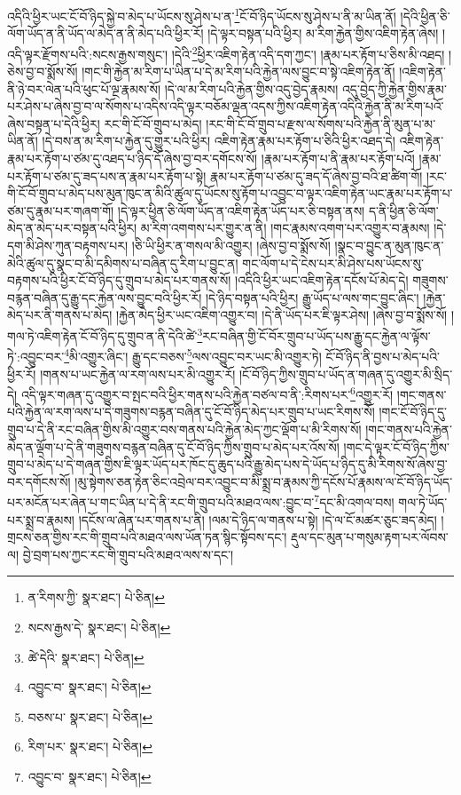འདིའི་ཕྱིར་ཡང་ངོ་བོ་ཉིད་སྐྱེ་བ་མེད་པ་ཡོངས་སུ་ཤེས་པ་ན་\footnote{ན་རིགས་ཀྱི་  སྣར་ཐང་།  པེ་ཅིན། }ངོ་བོ་ཉིད་ཡོངས་སུ་ཤེས་པ་ནི་མ་ཡིན་ནོ། །དེའི་ཕྱིན་ཅི་ལོག་ཡོད་ན་ནི་ཡོད་ལ་མེད་ན་ནི་མེད་པའི་ཕྱིར་རོ། །དེ་ལྟར་བསྟན་པའི་ཕྱིར། མ་རིག་རྐྱེན་གྱིས་འཇིག་རྟེན་ཞེས། །འདི་ལྟར་རྫོགས་པའི་:སངས་རྒྱས་གསུང་། །དེའི་\footnote{སངས་རྒྱས་དེ་  སྣར་ཐང་།  པེ་ཅིན། }ཕྱིར་འཇིག་རྟེན་འདི་དག་ཀྱང་། །རྣམ་པར་རྟོག་པ་ཅིས་མི་འཐད། །ཅེས་བྱ་བ་སྨོས་སོ། །གང་གི་རྐྱེན་མ་རིག་པ་ཡིན་པ་དེ་མ་རིག་པའི་རྐྱེན་ལས་བྱུང་བ་སྟེ་འཇིག་རྟེན་ནོ། །འཇིག་རྟེན་ནི་ཉེ་བར་ལེན་པའི་ཕུང་པོ་ལྔ་རྣམས་སོ། །དེ་ལ་མ་རིག་པའི་རྐྱེན་གྱིས་འདུ་བྱེད་རྣམས། འདུ་བྱེད་ཀྱི་རྐྱེན་གྱིས་རྣམ་པར་ཤེས་པ་ཞེས་བྱ་བ་ལ་སོགས་པ་འདིས་འདི་ལྟར་བཅོམ་ལྡན་འདས་ཀྱིས་འཇིག་རྟེན་འདིའི་རྐྱེན་ནི་མ་རིག་པའོ་ཞེས་བསྟན་པ་དེའི་ཕྱིར། རང་གི་ངོ་བོ་གྲུབ་པ་མེད། །རང་གི་ངོ་བོ་གྲུབ་པ་རྫས་ལ་སོགས་པའི་རྐྱེན་ནི་མུན་པ་མ་ཡིན་ནོ། །དེ་བས་ན་མ་རིག་པ་རྐྱེན་དུ་གྱུར་པའི་ཕྱིར། འཇིག་རྟེན་རྣམ་པར་རྟོག་པ་ཅིའི་ཕྱིར་འཐད་དེ། འཇིག་རྟེན་རྣམ་པར་རྟོག་པ་ཙམ་དུ་འཐད་པ་ཉིད་དོ་ཞེས་བྱ་བར་དགོངས་སོ། །རྣམ་པར་རྟོག་པ་ནི་རྣམ་པར་རྟོག་པའོ། །རྣམ་པར་རྟོག་པ་ཙམ་དུ་ཟད་པས་ན་རྣམ་པར་རྟོག་པ་སྟེ། རྣམ་པར་རྟོག་པ་ཙམ་དུ་ཟད་དོ་ཞེས་བྱ་བའི་ཐ་ཚིག་གོ། །རང་གི་ངོ་བོ་གྲུབ་པ་མེད་པས་མུན་ཁུང་ན་མིའི་ཚུལ་དུ་ཡོངས་སུ་རྟོག་པ་འབྱུང་བ་ལྟར་འཇིག་རྟེན་ཡང་རྣམ་པར་རྟོག་པ་ཙམ་དུ་རྣམ་པར་གཞག་གོ། །དེ་ལྟར་ཕྱིན་ཅི་ལོག་ཡོད་ན་འཇིག་རྟེན་ཡོད་པར་ཅི་བསྟན་ནས། ད་ནི་ཕྱིན་ཅི་ལོག་མེད་ན་མེད་པར་བསྟན་པའི་ཕྱིར། མ་རིག་འགགས་པར་གྱུར་ན་ནི། །གང་རྣམས་འགག་པར་འགྱུར་བ་རྣམས། །དེ་དག་མི་ཤེས་ཀུན་བརྟགས་པར། །ཅི་ཡི་ཕྱིར་ན་གསལ་མི་འགྱུར། །ཞེས་བྱ་བ་སྨོས་སོ། །སྣང་བ་བྱུང་ན་མུན་ཁུང་ན་མེའི་ཚུལ་དུ་སྣང་བ་མི་དམིགས་པ་བཞིན་དུ་རིག་པ་བྱུང་ན། གང་ལོག་པ་དེ་ངེས་པར་མི་ཤེས་པས་ཡོངས་སུ་བརྟགས་པའི་ཕྱིར་ངོ་བོ་ཉིད་དུ་གྲུབ་པ་མེད་པར་གནས་སོ། །འདིའི་ཕྱིར་ཡང་འཇིག་རྟེན་དངོས་པོ་མེད་དེ། གཟུགས་བརྙན་བཞིན་དུ་རྒྱུ་དང་རྐྱེན་ལས་བྱུང་བའི་ཕྱིར་རོ། །དེ་ཉིད་བསྟན་པའི་ཕྱིར། རྒྱུ་ཡོད་པ་ལས་གང་བྱུང་ཞིང་། །རྐྱེན་མེད་པར་ནི་གནས་པ་མེད། །རྐྱེན་མེད་ཕྱིར་ཡང་འཇིག་འགྱུར་བ། །དེ་ནི་ཡོད་པར་ཇི་ལྟར་ཤེས། །ཞེས་བྱ་བ་སྨོས་སོ། །གལ་ཏེ་འཇིག་རྟེན་ངོ་བོ་ཉིད་དུ་གྲུབ་ན་ནི་དེའི་ཚེ་\footnote{ཚེ་དེའི་  སྣར་ཐང་།  པེ་ཅིན། }རང་བཞིན་གྱི་ངོ་བོར་གྲུབ་པ་ཡོད་པས་རྒྱུ་དང་རྐྱེན་ལ་ལྟོས་ཏེ་:འབྱུང་བར་\footnote{འབྱུང་བ་  སྣར་ཐང་།  པེ་ཅིན། }མི་འགྱུར་ཞིང་། རྒྱུ་དང་བཅས་\footnote{བཅས་པ་  སྣར་ཐང་།  པེ་ཅིན། }ལས་འབྱུང་བར་ཡང་མི་འགྱུར་ཏེ། ངོ་བོ་ཉིད་ནི་བྱས་པ་མེད་པའི་ཕྱིར་རོ། །གནས་པ་ཡང་རྐྱེན་ལ་རག་ལས་པར་མི་འགྱུར་རོ། །ངོ་བོ་ཉིད་ཀྱིས་གྲུབ་པ་ཡོད་ན་གཞན་དུ་འགྱུར་མི་སྲིད་དེ། འདི་ལྟར་གཞན་དུ་འགྱུར་བ་སྤང་བའི་ཕྱིར་གནས་པའི་རྐྱེན་བཙལ་བ་ནི་:རིགས་པར་\footnote{རིག་པར་  སྣར་ཐང་།  པེ་ཅིན། }འགྱུར་རོ། །གང་གནས་པའི་རྐྱེན་ལ་རག་ལས་པ་དེ་གཟུགས་བརྙན་བཞིན་དུ་ངོ་བོ་ཉིད་མེད་པར་གྲུབ་པ་ཡང་རིགས་སོ། །གང་ངོ་བོ་ཉིད་དུ་གྲུབ་པ་དེ་ནི་རང་བཞིན་གྱིས་མི་འགྱུར་བས་གནས་པའི་རྐྱེན་མེད་ཀྱང་ལྡོག་པ་མི་རིགས་སོ། །གང་གནས་པའི་རྐྱེན་མེད་ན་ལྡོག་པ་དེ་ནི་གཟུགས་བརྙན་བཞིན་དུ་ངོ་བོ་ཉིད་ཀྱིས་གྲུབ་པ་མེད་པར་འོས་སོ། །གང་དེ་ལྟར་ངོ་བོ་ཉིད་ཀྱིས་གྲུབ་པ་མེད་པ་དེ་གཞན་གྱིས་ཇི་ལྟར་ཡོད་པར་ཁོང་དུ་ཆུད་པའི་རྒྱུ་མེད་པས་དེ་ཡོད་པ་ཉིད་དུ་མི་རིགས་སོ་ཞེས་བྱ་བར་དགོངས་སོ། །མུ་སྟེགས་ཅན་རྟེན་ཅིང་འབྲེལ་བར་འབྱུང་བ་མི་སྨྲ་བ་རྣམས་ཀྱི་དངོས་པོ་རྣམས་ལ་ངོ་བོ་ཉིད་ཡོད་པར་མངོན་པར་ཞེན་པ་གང་ཡིན་པ་དེ་ནི་རང་གི་གྲུབ་པའི་མཐའ་ལས་:བྱུང་བ་\footnote{འབྱུང་བ་  སྣར་ཐང་།  པེ་ཅིན། }དང་མི་འགལ་བས། གལ་ཏེ་ཡོད་པར་སྨྲ་བ་རྣམས། །དངོས་ལ་ཞེན་པར་གནས་པ་ནི། །ལམ་དེ་ཉིད་ལ་གནས་པ་སྟེ། །དེ་ལ་ངོ་མཚར་ཅུང་ཟད་མེད། །གྲངས་ཅན་གྱིས་རང་གི་གྲུབ་པའི་མཐའ་ལས་ཡོན་ཏན་སྙིང་སྟོབས་དང་། རྡུལ་དང་མུན་པ་གསུམ་རྟག་པར་ལོབས་ལ། བྱེ་བྲག་པས་ཀྱང་རང་གི་གྲུབ་པའི་མཐའ་ལས་ས་དང་། 